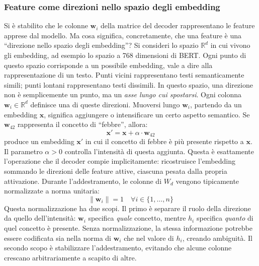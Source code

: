 \subsubsection{Feature come direzioni nello spazio degli embedding}
\label{subsubsec:features_as_directions}
Si è stabilito che le colonne $\mathbf{w}_i$ della matrice del decoder rappresentano le feature apprese dal modello. Ma cosa significa, concretamente, che una feature è una ``direzione nello spazio degli embedding''?
Si consideri lo spazio $\mathbb{R}^d$ in cui vivono gli embedding, ad esempio lo spazio a 768 dimensioni di BERT. Ogni punto di questo spazio corrisponde a un possibile embedding, vale a dire alla rappresentazione di un testo. Punti vicini rappresentano testi semanticamente simili; punti lontani rappresentano testi dissimili. In questo spazio, una direzione non è semplicemente un punto, ma un \textit{asse lungo cui spostarsi}.
Ogni colonna $\mathbf{w}_i \in \mathbb{R}^d$ definisce una di queste direzioni. Muoversi lungo $\mathbf{w}_i$, partendo da un embedding $\mathbf{x}$, significa aggiungere o intensificare un certo aspetto semantico. Se $\mathbf{w}_{42}$ rappresenta il concetto di ``febbre'', allora:
\begin{equation}
    \mathbf{x}' = \mathbf{x} + \alpha \cdot \mathbf{w}_{42}
\end{equation}
produce un embedding $\mathbf{x}'$ in cui il concetto di febbre è più presente rispetto a $\mathbf{x}$. Il parametro $\alpha > 0$ controlla l'intensità di questa aggiunta. Questa è esattamente l'operazione che il decoder compie implicitamente: ricostruisce l'embedding sommando le direzioni delle feature attive, ciascuna pesata dalla propria attivazione.
Durante l'addestramento, le colonne di $W_d$ vengono tipicamente normalizzate a norma unitaria:
\begin{equation}
    \|\mathbf{w}_i\| = 1 \quad \forall i \in \{1, \dots, n\}
\end{equation}
Questa normalizzazione ha due scopi. Il primo è separare il ruolo della direzione da quello dell'intensità: $\mathbf{w}_i$ specifica \textit{quale} concetto, mentre $h_i$ specifica \textit{quanto} di quel concetto è presente. Senza normalizzazione, la stessa informazione potrebbe essere codificata sia nella norma di $\mathbf{w}_i$ che nel valore di $h_i$, creando ambiguità. Il secondo scopo è stabilizzare l'addestramento, evitando che alcune colonne crescano arbitrariamente a scapito di altre.

